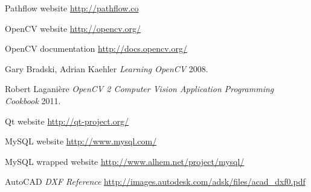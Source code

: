 \begin{thebibliography}{1}
 Pathflow website \url{http://pathflow.co}

 OpenCV website \url{http://opencv.org/}

 OpenCV documentation \url{http://docs.opencv.org/}

 Gary Bradski, Adrian Kaehler {\em Learning OpenCV} 2008.

 Robert Laganière {\em OpenCV 2 Computer Vision Application Programming Cookbook} 2011.

 Qt website \url{http://qt-project.org/}

 MySQL website \url{http://www.mysql.com/}

 MySQL wrapped website \url{http://www.alhem.net/project/mysql/}

 AutoCAD {\em DXF Reference} \url{http://images.autodesk.com/adsk/files/acad_dxf0.pdf}



\end{thebibliography}